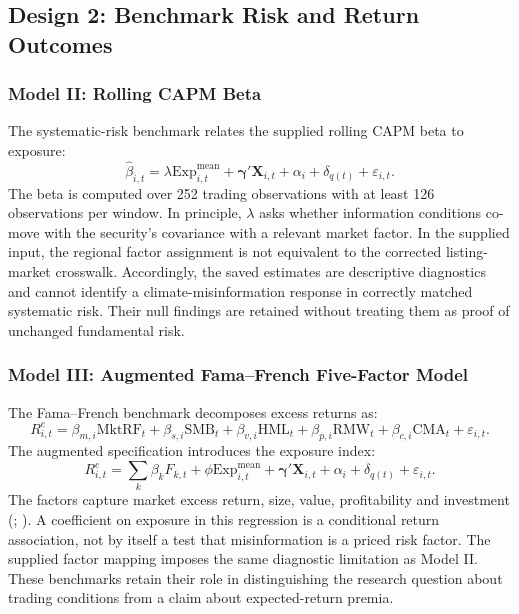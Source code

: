 \documentclass{article}
\theoremstyle{plain}
\begin{document}
\subsection{Design 2: Benchmark Risk and Return Outcomes}
\subsubsection{Model II: Rolling CAPM Beta}
The systematic-risk benchmark relates the supplied rolling CAPM beta to exposure:
\begin{equation}
\hat\beta_{i,t}=\lambda\mathrm{Exp}^{\mathrm{mean}}_{i,t}+\boldsymbol\gamma'\mathbf X_{i,t}+\alpha_i+\delta_{q(t)}+\varepsilon_{i,t}.
\label{eq:beta_misinfo}
\end{equation}
The beta is computed over 252 trading observations with at least 126 observations per window. In principle, $\lambda$ asks whether information conditions co-move with the security's covariance with a relevant market factor. In the supplied input, the regional factor assignment is not equivalent to the corrected listing-market crosswalk. Accordingly, the saved estimates are descriptive diagnostics and cannot identify a climate-misinformation response in correctly matched systematic risk. Their null findings are retained without treating them as proof of unchanged fundamental risk.

\subsubsection{Model III: Augmented Fama--French Five-Factor Model}
The Fama--French benchmark decomposes excess returns as:
\begin{equation}
R^e_{i,t}=\beta_{m,i}\mathrm{MktRF}_t+\beta_{s,i}\mathrm{SMB}_t+\beta_{v,i}\mathrm{HML}_t+\beta_{p,i}\mathrm{RMW}_t+\beta_{c,i}\mathrm{CMA}_t+\varepsilon_{i,t}.
\label{eq:ff5}
\end{equation}
The augmented specification introduces the exposure index:
\begin{equation}
R^e_{i,t}=\sum_k\beta_kF_{k,t}+\phi\mathrm{Exp}^{\mathrm{mean}}_{i,t}+\boldsymbol\gamma'\mathbf X_{i,t}+\alpha_i+\delta_{q(t)}+\varepsilon_{i,t}.
\label{eq:ff5_aug}
\end{equation}
The factors capture market excess return, size, value, profitability and investment (\cite{fama1993}; \cite{fama2015}). A coefficient on exposure in this regression is a conditional return association, not by itself a test that misinformation is a priced risk factor. The supplied factor mapping imposes the same diagnostic limitation as Model II. These benchmarks retain their role in distinguishing the research question about trading conditions from a claim about expected-return premia.
\end{document}
